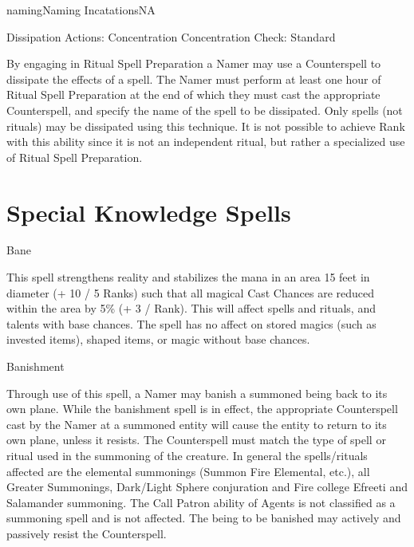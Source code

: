 \begin{College}[2.0]{naming}{Naming Incatations}{NA}
\begin{ritual}[Q-1]{Dissipation}
Actions: Concentration 
Concentration Check: Standard 
\begin{effects}
By engaging in Ritual Spell Preparation a Namer may use a Counterspell
to dissipate the effects of a spell. The Namer must perform at least
one hour of Ritual Spell Preparation at the end of which they must
cast the appropriate Counterspell, and specify the name of the spell
to be dissipated.  Only spells (not rituals) may be dissipated using
this technique.  It is not possible to achieve Rank with this ability
since it is not an independent ritual, but rather a specialized use of
Ritual Spell Preparation.
\end{effects}
\end{ritual}

\section{Special Knowledge Spells}

\begin{spell}[S-1]{Bane}

\begin{effects}
This spell strengthens reality and stabilizes the mana in an area 15
feet in diameter (+ 10 / 5 Ranks) such that all magical Cast Chances
are reduced within the area by 5\% (+ 3 / Rank).  This will affect
spells and rituals, and talents with base chances.  The spell has no
affect on stored magics (such as invested items), shaped items, or
magic without base chances.
\end{effects}
\end{spell}

\begin{spell}[S-2]{Banishment}

\begin{effects}
Through use of this spell, a Namer may banish a summoned being back to
its own plane.  While the banishment spell is in effect, the
appropriate Counterspell cast by the Namer at a summoned entity will
cause the entity to return to its own plane, unless it resists. The
Counterspell must match the type of spell or ritual used in the
summoning of the creature. In general the spells/rituals affected are
the elemental summonings (Summon Fire Elemental, etc.), all Greater
Summonings, Dark/Light Sphere conjuration and Fire college Efreeti and
Salamander summoning.  The Call Patron ability of Agents is not
classified as a summoning spell and is not affected.  The being to be
banished may actively and passively resist the Counterspell.
\end{effects}
\end{spell}


\end{College}

